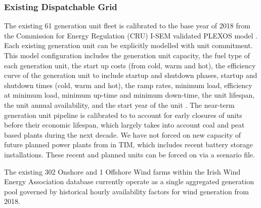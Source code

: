 \documentclass[gmd,manuscript]{copernicus}
\begin{document}
\subsubsection{Existing Dispatchable Grid}
The existing 61 generation unit fleet is calibrated to the base year of 2018 from the Commission for Energy Regulation (CRU) I-SEM validated PLEXOS model \citep{Geffert2018}. Each existing generation unit can be explicitly modelled with unit commitment. This model configuration includes the generation unit capacity, the fuel type of each generation unit, the start up costs (from cold, warm and hot), the efficiency curve of the generation unit to include startup and shutdown phases, startup and shutdown times (cold, warm and hot), the ramp rates, minimum load, efficiency at minimum load, minimum up-time and minimum down-time, the unit lifespan, the unit annual availability, and the start year of the unit \citep{Geffert2018}. The near-term generation unit pipeline is calibrated to \citet{EirGridadSONI2019,EirGrid&SONI2020} to account for early closures of units before their economic lifespan, which largely takes into account coal and peat based plants during the next decade. We have not forced on new capacity of future planned power plants from \citet{EirGrid&SONI2020} in TIM, which includes recent battery storage installations. These recent and planned units can be forced on via a scenario file. 

The existing 302 Onshore and 1 Offshore Wind farms within the Irish Wind Energy Association database currently operate as a single aggregated generation pool governed by historical hourly availability factors for wind generation from 2018.
\end{document}
